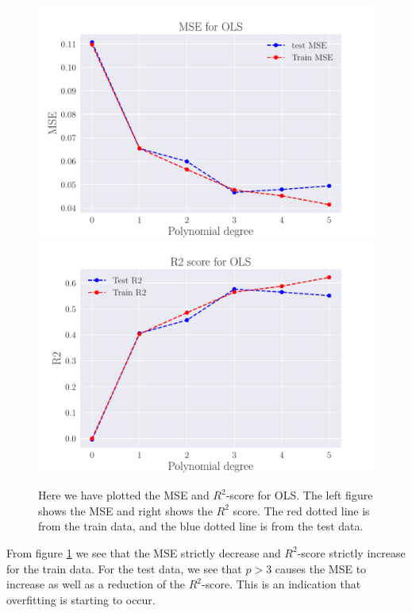 \documentclass[reprint,english,notitlepage,aps,nobalancelastpage,nofootinbib]{revtex4-1}  %
\begin{document}
\begin{figure}[H]
	\includegraphics[width=\linewidth]{MSE_OLS_n30_eps02_pol5.pdf}
	\endminipage\hfill
	\includegraphics[width=\linewidth]{R2_OLS_n30_eps02_pol5.pdf}
	\endminipage
	\caption{Here we have plotted the MSE and $R^2$-score for OLS. The left figure shows the MSE and right shows the $R^2$ score. The red dotted line is from the train data, and the blue dotted line is from the test data.}\label{fig:OLS_R2_and_MSE}
\end{figure}
From figure \ref{fig:OLS_R2_and_MSE} we see that the MSE strictly decrease and $R^2$-score strictly increase for the train data. For the test data, we see that $p>3$ causes the MSE to increase as well as a reduction of the $R^2$-score. This is an indication that overfitting is starting to occur.
\end{document}
